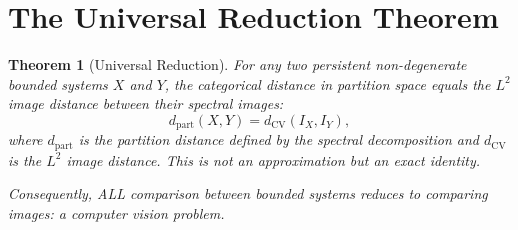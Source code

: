 \documentclass[11pt,twocolumn,a4paper]{article}
\newtheorem{theorem}{Theorem}[section]
\begin{document}


\section{The Universal Reduction Theorem}
\label{sec:universal_reduction}

\begin{theorem}[Universal Reduction]
\label{thm:universal_reduction}
For any two persistent non-degenerate bounded systems $X$ and $Y$,
the categorical distance in partition space equals the $L^2$ image
distance between their spectral images:
\begin{equation}
\label{eq:universal_reduction}
  d_{\mathrm{part}}(X, Y) = d_{\mathrm{CV}}(I_X, I_Y),
\end{equation}
where $d_{\mathrm{part}}$ is the partition distance defined by the
spectral decomposition and $d_{\mathrm{CV}}$ is the $L^2$ image
distance. This is not an approximation but an exact identity.

Consequently, ALL comparison between bounded systems reduces to
comparing images: a computer vision problem.
\end{theorem}
\end{document}
